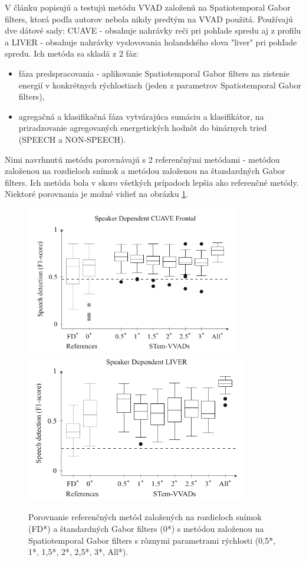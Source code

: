 V článku \cite{joosten2015voice} popisujú a testujú metódu VVAD založenú na Spatiotemporal Gabor filters, ktorá podľa autorov nebola nikdy predtým na VVAD použitá.
Používajú dve dátové sady: CUAVE - obsahuje nahrávky reči pri pohľade spredu aj z profilu a LIVER - obsahuje nahrávky vyslovovania holandského slova "liver" pri pohľade spredu.
Ich metóda sa skladá z 2 fáz: 
\begin{itemize}
	\item fáza predspracovania - aplikovanie Spatiotemporal Gabor filters na zistenie energií v konkrétnych rýchlostiach (jeden z parametrov Spatiotemporal Gabor filters),
	\item agregačná a klasifikačná fáza vytvárajúca sumáciu a klasifikátor, na priradzovanie agregovaných energetických hodnôt do binárnych tried (SPEECH a NON-SPEECH).
\end{itemize}
Nimi navrhnutú metódu porovnávajú s 2 referenčnými metódami - metódou založenou na rozdieloch snímok a metódou založenou na štandardných Gabor filters. 
Ich metóda bola v skoro všetkých prípadoch lepšia ako referenčné metódy. 
Niektoré porovnania je možné vidieť na obrázku \ref{pic-joosten2015voice}.

\begin{figure}[H]
	\begin{center}
		\includegraphics[height=6.5cm]{pics/cuaveFrontal.png}
		\includegraphics[height=6.5cm]{pics/liver.png}
		\caption{Porovnanie referenčných metód založených na rozdieloch snímok (FD*) a štandardných Gabor filters (0*) s metódou založenou na Spatiotemporal Gabor filters s rôznymi parametrami rýchlosti (0,5*, 1*, 1,5*, 2*, 2,5*, 3*, All*).
		 \cite{joosten2015voice}}
		\label{pic-joosten2015voice}
	\end{center}
\end{figure}

